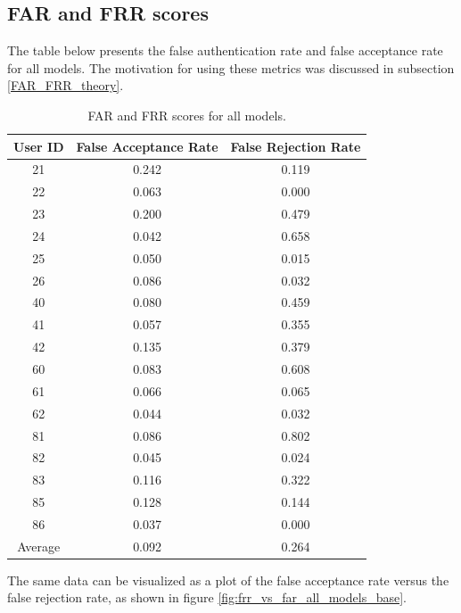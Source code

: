 \subsection{FAR and FRR scores}
The table below presents the false authentication rate and false acceptance rate for all models. The motivation for using these metrics was discussed in subsection \ref{FAR_FRR_theory}.

\begin{center}
\begin{table}[H]
\begin{center}
	\begin{tabular}{ |c|c|c| } 
		\hline
		User ID & False Acceptance Rate & False Rejection Rate \\
		\hline
		21 & 0.242 & 0.119 \\
		\hline
		22 & 0.063 & 0.000 \\
		\hline
		23 & 0.200 & 0.479 \\
		\hline
		24 & 0.042 & 0.658 \\
		\hline
		25 & 0.050 & 0.015 \\
		\hline
		26 & 0.086 & 0.032 \\
		\hline
		40 & 0.080 & 0.459 \\
		\hline
		41 & 0.057 & 0.355 \\
		\hline
		42 & 0.135 & 0.379 \\
		\hline
		60 & 0.083 & 0.608 \\
		\hline
		61 & 0.066 & 0.065 \\
		\hline
		62 & 0.044 & 0.032 \\
		\hline
		81 & 0.086 & 0.802 \\
		\hline
		82 & 0.045 & 0.024 \\
		\hline
		83 & 0.116 & 0.322 \\
		\hline
		85 & 0.128 & 0.144 \\
		\hline
		86 & 0.037 & 0.000 \\
		\hline
		\hline
		Average & 0.092 & 0.264 \\
		\hline
	\end{tabular}
\end{center}
\caption{FAR and FRR scores for all models.}
\label{table:FAR_FRR_base}
\end{table}
\end{center}

The same data can be visualized as a plot of the false acceptance rate versus the false rejection rate, as shown in figure \ref{fig:frr_vs_far_all_models_base}. 

